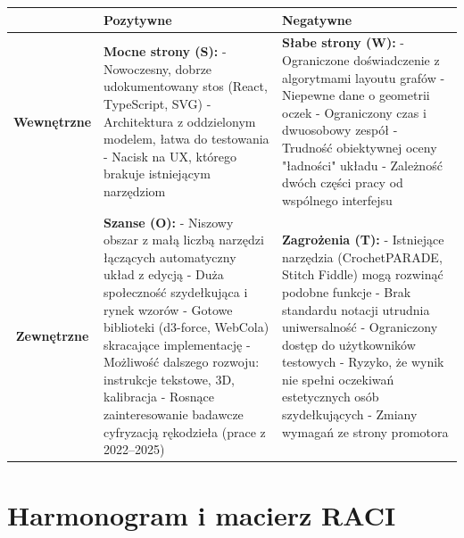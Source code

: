 \documentclass[a4paper,11pt]{article}
\begin{document}
\begin{tabularx}{0.95\textwidth}{|c|X|X|}
  \hline
   & \textbf{Pozytywne} & \textbf{Negatywne} \\
  \hline
  \textbf{Wewnętrzne} & \textbf{Mocne strony (S):} \newline - Nowoczesny, dobrze udokumentowany stos (React, TypeScript, SVG) \newline - Architektura z oddzielonym modelem, łatwa do testowania \newline - Nacisk na UX, którego brakuje istniejącym narzędziom & \textbf{Słabe strony (W):} \newline - Ograniczone doświadczenie z algorytmami layoutu grafów \newline - Niepewne dane o geometrii oczek \newline - Ograniczony czas i dwuosobowy zespół \newline - Trudność obiektywnej oceny "ładności" układu \newline - Zależność dwóch części pracy od wspólnego interfejsu \\
  \hline
  \textbf{Zewnętrzne} & \textbf{Szanse (O):} \newline - Niszowy obszar z małą liczbą narzędzi łączących automatyczny układ z edycją \newline - Duża społeczność szydełkująca i rynek wzorów \newline - Gotowe biblioteki (d3-force, WebCola) skracające implementację \newline - Możliwość dalszego rozwoju: instrukcje tekstowe, 3D, kalibracja \newline - Rosnące zainteresowanie badawcze cyfryzacją rękodzieła (prace z 2022–2025) & \textbf{Zagrożenia (T):}  \newline - Istniejące narzędzia (CrochetPARADE, Stitch Fiddle) mogą rozwinąć podobne funkcje \newline - Brak standardu notacji utrudnia uniwersalność \newline - Ograniczony dostęp do użytkowników testowych \newline - Ryzyko, że wynik nie spełni oczekiwań estetycznych osób szydełkujących \newline - Zmiany wymagań ze strony promotora \\
  \hline
\end{tabularx}

\pagebreak

\section{Harmonogram i macierz RACI}
\end{document}
